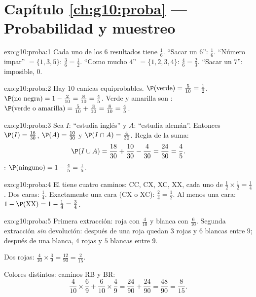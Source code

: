 \section*{Capítulo \ref{ch:g10:proba} --- Probabilidad y muestreo}

\begin{solution}{exo:g10:proba:1}
Cada uno de los $6$ resultados tiene  $\frac16$.
``Sacar un $6$'': $\frac16$.
``Número impar'' $= \{1, 3, 5\}$: $\frac36 = \frac12$.
``Como mucho $4$'' $= \{1,2,3,4\}$: $\frac46 = \frac23$.
``Sacar un $7$'':  imposible,  $0$.
\end{solution}

\begin{solution}{exo:g10:proba:2}
Hay $10$ canicas equiprobables.
$\P(\text{verde}) = \frac{5}{10} = \frac12$.
$\P(\text{no negra}) = 1 - \frac{2}{10} = \frac{8}{10} = \frac45$.
Verde y amarilla son :
$\P(\text{verde o amarilla}) = \frac{5}{10} + \frac{3}{10} = \frac{8}{10}
= \frac45$.
\end{solution}

\begin{solution}{exo:g10:proba:3}
Sea $I$: ``estudia inglés'' y $A$: ``estudia alemán''. Entonces
$\P(I) = \frac{18}{30}$, $\P(A) = \frac{10}{30}$ y
$\P(I \cap A) = \frac{4}{30}$. Regla de la suma:
\[
\P(I \cup A) = \frac{18}{30} + \frac{10}{30} - \frac{4}{30}
= \frac{24}{30} = \frac45 .
\]
: $\P(\text{ninguno}) = 1 - \frac45 = \frac15$.
\end{solution}

\begin{solution}{exo:g10:proba:4}
El  tiene cuatro caminos: CC, CX, XC, XX, cada uno de 
$\frac12 \times \frac12 = \frac14$.
Dos caras: $\frac14$. Exactamente una cara (CX o XC):
$\frac24 = \frac12$. Al menos una cara:
$1 - \P(\text{XX}) = 1 - \frac14 = \frac34$.
\end{solution}

\begin{solution}{exo:g10:proba:5}
Primera extracción: roja con  $\frac{4}{10}$ y blanca con
$\frac{6}{10}$. Segunda extracción \emph{sin} devolución: después de una
roja quedan $3$ rojas y $6$ blancas entre $9$; después de una blanca, $4$
rojas y $5$ blancas entre $9$.

Dos rojas: $\frac{4}{10} \times \frac39 = \frac{12}{90} = \frac{2}{15}$.

Colores distintos: caminos RB y BR:
\[
\frac{4}{10} \times \frac69 + \frac{6}{10} \times \frac49
= \frac{24}{90} + \frac{24}{90} = \frac{48}{90} = \frac{8}{15}.
\]
\end{solution}

